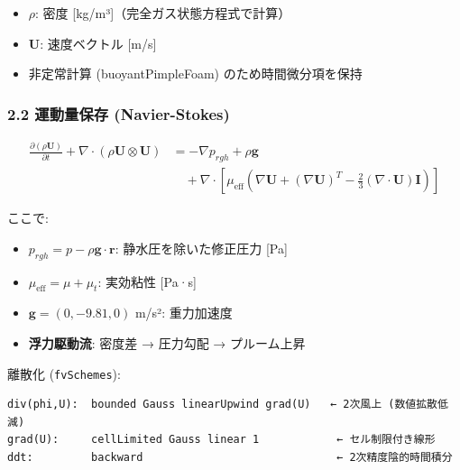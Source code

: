 \documentclass[a4paper,11pt]{article}
\begin{document}
\begin{itemize} \item $\rho$: 密度 [kg/m³]（完全ガス状態方程式で計算） \end{itemize}
\begin{itemize} \item $\mathbf{U}$: 速度ベクトル [m/s] \end{itemize}
\begin{itemize} \item 非定常計算 (buoyantPimpleFoam) のため時間微分項を保持 \end{itemize}

\subsubsection{2.2 運動量保存 (Navier-Stokes)}

\begin{align*}
\frac{\partial (\rho \mathbf{U})}{\partial t}
+ \nabla \cdot (\rho \mathbf{U} \otimes \mathbf{U})
&= -\nabla p_{rgh} + \rho \mathbf{g} \\
&\quad + \nabla \cdot \left[ \mu_{\text{eff}} \left(
  \nabla \mathbf{U} + (\nabla \mathbf{U})^T
  - \tfrac{2}{3} (\nabla \cdot \mathbf{U}) \mathbf{I}
\right) \right]
\end{align*}

ここで:

\begin{itemize} \item $p_{rgh} = p - \rho \mathbf{g} \cdot \mathbf{r}$: 静水圧を除いた修正圧力 [Pa] \end{itemize}
\begin{itemize} \item $\mu_{\text{eff}} = \mu + \mu_t$: 実効粘性 [Pa·s] \end{itemize}
\begin{itemize} \item $\mathbf{g} = (0, -9.81, 0)$ m/s²: 重力加速度 \end{itemize}
\begin{itemize} \item \textbf{浮力駆動流}: 密度差 → 圧力勾配 → プルーム上昇 \end{itemize}

離散化 (\texttt{fvSchemes}):

\begin{verbatim}
div(phi,U):  bounded Gauss linearUpwind grad(U)   ← 2次風上 (数値拡散低減)
grad(U):     cellLimited Gauss linear 1            ← セル制限付き線形
ddt:         backward                              ← 2次精度陰的時間積分
\end{verbatim}
\end{document}
